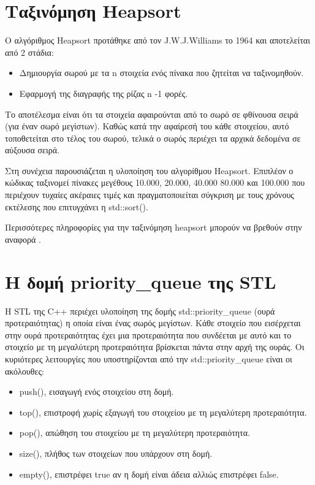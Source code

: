 


\section{Ταξινόμηση Heapsort}
Ο αλγόριθμος Heapsort προτάθηκε από τον J.W.J.Williams το 1964 \cite{nist_heapsort} και αποτελείται από 2 στάδια:
\begin{itemize}[noitemsep]
\item Δημιουργία σωρού με τα n στοιχεία ενός πίνακα που ζητείται να ταξινομηθούν. 
\item Εφαρμογή της διαγραφής της ρίζας n -1 φορές.
\end{itemize}
Το αποτέλεσμα είναι ότι τα στοιχεία αφαιρούνται από το σωρό σε φθίνουσα σειρά (για έναν σωρό μεγίστων). Καθώς κατά την αφαίρεσή του κάθε στοιχείου, αυτό τοποθετείται στο τέλος του σωρού, τελικά ο σωρός περιέχει τα αρχικά δεδομένα σε αύξουσα σειρά. 

Στη συνέχεια παρουσιάζεται η υλοποίηση του αλγορίθμου Heapsort. Επιπλέον ο κώδικας ταξινομεί πίνακες μεγέθους 10.000, 20.000, 40.000 80.000 και 100.000 που περιέχουν τυχαίες ακέραιες τιμές και πραγματοποιείται σύγκριση με τους χρόνους εκτέλεσης που επιτυγχάνει η std::sort().





Περισσότερες πληροφορίες για την ταξινόμηση heapsort μπορούν να βρεθούν στην αναφορά \cite{programiz_heapsort}.


\section{Η δομή priority\_queue της STL}
Η STL της C++ περιέχει υλοποίηση της δομής std::priority\_queue (ουρά προτεραιότητας) η οποία είναι ένας σωρός μεγίστων. Κάθε στοιχείο που εισέρχεται  στην ουρά προτεραιότητας έχει μια προτεραιότητα που συνδέεται με αυτό και το στοιχείο με τη μεγαλύτερη προτεραιότητα βρίσκεται πάντα στην αρχή της ουράς. Οι κυριότερες λειτουργίες που υποστηρίζονται από την std::priority\_queue είναι οι ακόλουθες:
\begin{itemize}[noitemsep]
\item push(), εισαγωγή ενός στοιχείου στη δομή.
\item top(), επιστροφή χωρίς εξαγωγή του στοιχείου με τη μεγαλύτερη προτεραιότητα.
\item pop(), απώθηση του στοιχείου με τη μεγαλύτερη προτεραιότητα.
\item size(), πλήθος των στοιχείων που υπάρχουν στη δομή.
\item empty(), επιστρέφει true αν η δομή είναι άδεια αλλιώς επιστρέφει false.
\end{itemize}

